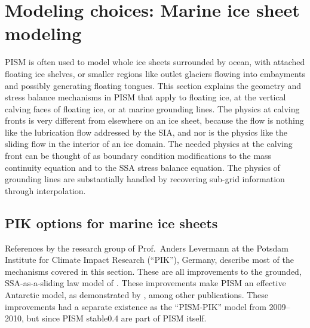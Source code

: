 
\section{Modeling choices: Marine ice sheet modeling}
\label{sec:marine}

PISM is often used to model whole ice sheets surrounded by ocean, with attached floating ice shelves, or smaller regions like outlet glaciers flowing into embayments and possibly generating floating tongues.  This section explains the geometry and stress balance mechanisms in PISM that apply to floating ice, at the vertical calving faces of floating ice, or at marine grounding lines.  The physics at calving fronts is very different from elsewhere on an ice sheet, because the flow is nothing like the lubrication flow addressed by the SIA, and nor is the physics like the sliding flow in the interior of an ice domain.  The needed physics at the calving front can be thought of as boundary condition modifications to the mass continuity equation and to the SSA stress balance equation.  The physics of grounding lines are substantially handled by recovering sub-grid information through interpolation.


\subsection{PIK options for marine ice sheets}
\label{sec:pism-pik}

References \cite{Albrechtetal2011,Levermannetal2012,Winkelmannetal2011} by the research group of Prof.~Anders Levermann at the Potsdam Institute for Climate Impact Research (``PIK''), Germany, describe most of the mechanisms covered in this section.  These are all improvements to the grounded, SSA-as-a-sliding law model of \cite{BBssasliding}.  These improvements make PISM an effective Antarctic model, as demonstrated by \cite{Golledgeetal2013,Martinetal2011,Winkelmannetal2012}, among other publications.  These improvements had a separate existence as the ``PISM-PIK'' model from 2009--2010, but since PISM stable0.4 are part of PISM itself.  

